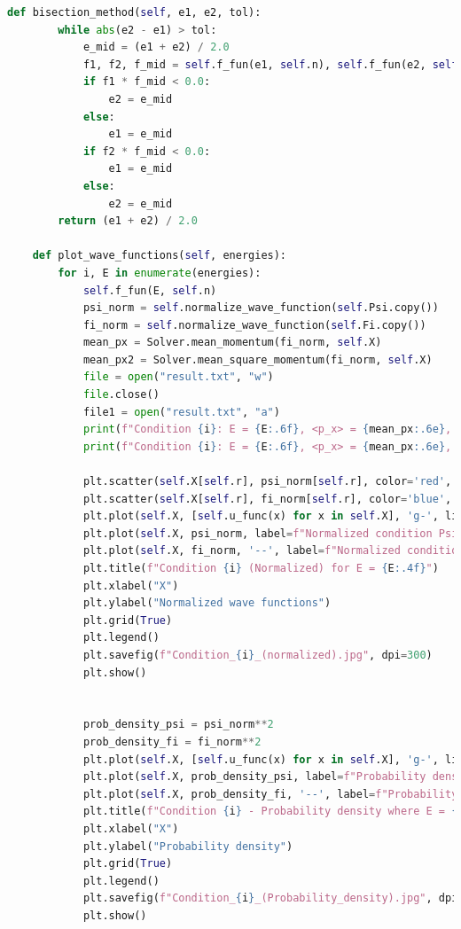 \documentclass[a4paper,12pt]{article}
\begin{document}
\begin{lstlisting}[language=Python, caption=Код файла solver.py,label={lst:solver}]
    def bisection_method(self, e1, e2, tol):
        while abs(e2 - e1) > tol:
            e_mid = (e1 + e2) / 2.0
            f1, f2, f_mid = self.f_fun(e1, self.n), self.f_fun(e2, self.n), self.f_fun(e_mid, self.n)
            if f1 * f_mid < 0.0:
                e2 = e_mid
            else:
                e1 = e_mid
            if f2 * f_mid < 0.0:
                e1 = e_mid
            else:
                e2 = e_mid
        return (e1 + e2) / 2.0

    def plot_wave_functions(self, energies):
        for i, E in enumerate(energies):
            self.f_fun(E, self.n)
            psi_norm = self.normalize_wave_function(self.Psi.copy())
            fi_norm = self.normalize_wave_function(self.Fi.copy())
            mean_px = Solver.mean_momentum(fi_norm, self.X)
            mean_px2 = Solver.mean_square_momentum(fi_norm, self.X)
            file = open("result.txt", "w")
            file.close()
            file1 = open("result.txt", "a")
            print(f"Condition {i}: E = {E:.6f}, <p_x> = {mean_px:.6e}, <p_x^2> = {mean_px2:.6e}")
            print(f"Condition {i}: E = {E:.6f}, <p_x> = {mean_px:.6e}, <p_x^2> = {mean_px2:.6e}", file = file1)

            plt.scatter(self.X[self.r], psi_norm[self.r], color='red', s=50, zorder=5)  # Point at Psi
            plt.scatter(self.X[self.r], fi_norm[self.r], color='blue', s=50, zorder=5)  # Point at Fi
            plt.plot(self.X, [self.u_func(x) for x in self.X], 'g-', linewidth=6.0, label="U(x)")
            plt.plot(self.X, psi_norm, label=f"Normalized condition Psi {i}")
            plt.plot(self.X, fi_norm, '--', label=f"Normalized condition Phi {i}")
            plt.title(f"Condition {i} (Normalized) for E = {E:.4f}")
            plt.xlabel("X")
            plt.ylabel("Normalized wave functions")
            plt.grid(True)
            plt.legend()
            plt.savefig(f"Condition_{i}_(normalized).jpg", dpi=300)
            plt.show()


            prob_density_psi = psi_norm**2
            prob_density_fi = fi_norm**2
            plt.plot(self.X, [self.u_func(x) for x in self.X], 'g-', linewidth=6.0, label="U(x)")
            plt.plot(self.X, prob_density_psi, label=f"Probability density Psi condition {i+1}")
            plt.plot(self.X, prob_density_fi, '--', label=f"Probability Density Phi condition {i+1}")
            plt.title(f"Condition {i} - Probability density where E = {E:.4f}")
            plt.xlabel("X")
            plt.ylabel("Probability density")
            plt.grid(True)
            plt.legend()
            plt.savefig(f"Condition_{i}_(Probability_density).jpg", dpi=300)
            plt.show()



\end{lstlisting}
\end{document}
